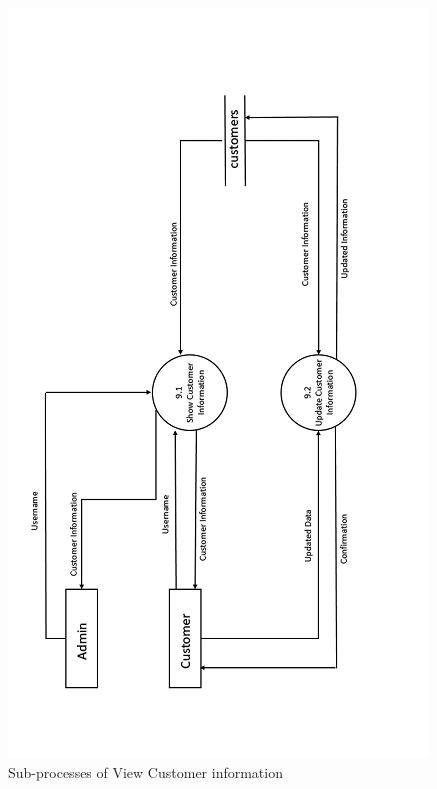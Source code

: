 \begin{figure}
 \centering
\includegraphics{figures/9final.png}
\caption{Sub-processes of View Customer information}
\end{figure}




